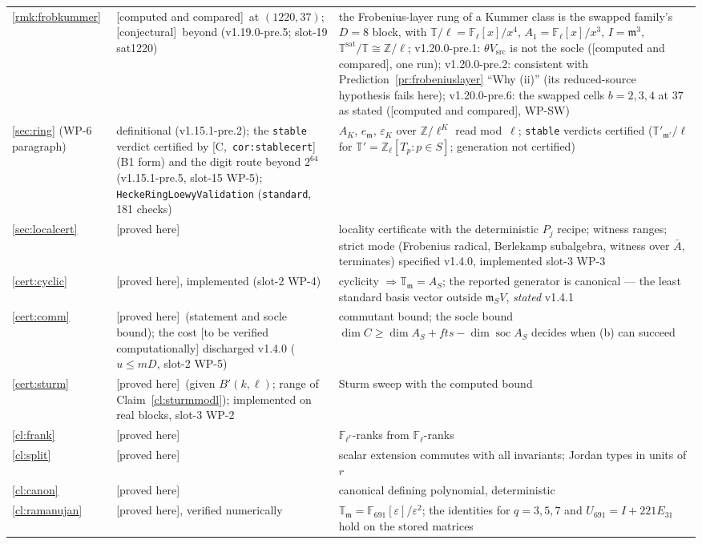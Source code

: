 \documentclass[11pt]{article}
\theoremstyle{remark}
\newcommand{\F}{\mathbb{F}}
\newcommand{\Z}{\mathbb{Z}}
\newcommand{\Fl}{\F_\ell}
\newcommand{\Flr}{\F_{\ell^r}}
\DeclareMathOperator{\soc}{soc}
\newcommand{\T}{\mathbb{T}}
\newcommand{\m}{\mathfrak{m}}
\newcommand{\HA}[1]{[C,~\texttt{#1}]}      %
\newcommand{\PROVED}{\textsf{[proved here]}}
\newcommand{\CONJ}{\textsf{[conjectural]}}
\newcommand{\VERIFY}{\textsf{[to be verified computationally]}}
\newcommand{\CMPD}{\textsf{[computed and compared]}}   %
\begin{document}
\begin{center}
\begin{longtable}{@{}l>{\raggedright\arraybackslash}p{3.6cm}>{\raggedright\arraybackslash}p{10.6cm}@{}}
\ref{rmk:frobkummer} & \CMPD\ at $(1220,37)$; \CONJ\ beyond (v1.19.0-pre.5; slot-19 sat1220) & the Frobenius-layer rung of a Kummer class is the swapped family's $D=8$ block, with $\T/\ell=\Fl[x]/x^{4}$, $A_1=\Fl[x]/x^{3}$, $I=\m^{3}$, $\T^{\mathrm{sat}}/\T\cong\Z/\ell$; v1.20.0-pre.1: $\theta V_{\mathrm{src}}$ is not the socle (\CMPD, one run); v1.20.0-pre.2: consistent with Prediction~\ref{pr:frobeniuslayer} ``Why (ii)'' (its reduced-source hypothesis fails here); v1.20.0-pre.6: the swapped cells $b=2,3,4$ at $37$ as stated (\CMPD, WP-SW) \\
\ref{sec:ring} (WP-6 paragraph) & definitional (v1.15.1-pre.2); the \texttt{stable} verdict certified by \HA{cor:stablecert} (B1 form) and the digit route beyond $2^{64}$ (v1.15.1-pre.5, slot-15 WP-5); \texttt{HeckeRingLoewyValidation} (\texttt{standard}, 181 checks) & $A_K$, $e_\m$, $\varepsilon_K$ over $\Z/\ell^K$ read mod~$\ell$; \texttt{stable} verdicts certified ($\mathbb{T}'_{\m'}/\ell$ for $\mathbb{T}'=\Z_\ell[T_p:p\in S]$; generation not certified) \\
\ref{sec:localcert} & \PROVED & locality certificate with the deterministic $P_j$ recipe; witness ranges; strict mode (Frobenius radical, Berlekamp subalgebra, witness over $\bar A$, terminates) specified v1.4.0, implemented slot-3 WP-3 \\
\ref{cert:cyclic} & \PROVED, implemented (slot-2 WP-4) & cyclicity $\Rightarrow\T_\m=A_S$; the reported generator is canonical --- the least standard basis vector outside $\m_SV$, \emph{stated} v1.4.1 \\
\ref{cert:comm} & \PROVED\ (statement and socle bound); the cost \VERIFY{} discharged v1.4.0 ($u\le mD$, slot-2 WP-5) & commutant bound; the socle bound $\dim C\ge\dim A_S+fts-\dim\soc A_S$ decides when (b) can succeed \\
\ref{cert:sturm} & \PROVED\ (given $B'(k,\ell)$; range of Claim~\ref{cl:sturmmodl}); implemented on real blocks, slot-3 WP-2 & Sturm sweep with the computed bound \\
\ref{cl:frank} & \PROVED & $\Flr$-ranks from $\Fl$-ranks \\
\ref{cl:split} & \PROVED & scalar extension commutes with all invariants; Jordan types in units of $r$ \\
\ref{cl:canon} & \PROVED & canonical defining polynomial, deterministic \\
\ref{cl:ramanujan} & \PROVED, verified numerically & $\T_\m=\F_{691}[\varepsilon]/\varepsilon^2$; the identities for $q=3,5,7$ and $U_{691}=I+221E_{31}$ hold on the stored matrices \\

\end{longtable}
\end{center}
\end{document}
